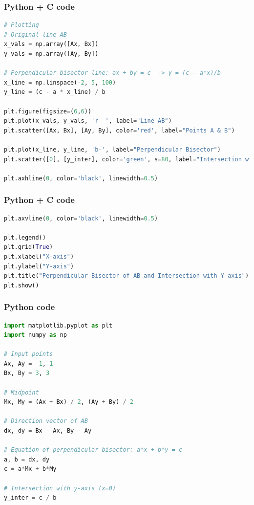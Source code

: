 \documentclass{beamer}
\begin{document}
\begin{frame}[fragile]
    \frametitle{Python + C code}

    \begin{lstlisting}[language=Python]
# Plotting
# Original line AB
x_vals = np.array([Ax, Bx])
y_vals = np.array([Ay, By])

# Perpendicular bisector line: ax + by = c  -> y = (c - a*x)/b
x_line = np.linspace(-2, 5, 100)
y_line = (c - a * x_line) / b

plt.figure(figsize=(6,6))
plt.plot(x_vals, y_vals, 'r--', label="Line AB")
plt.scatter([Ax, Bx], [Ay, By], color='red', label="Points A & B")

plt.plot(x_line, y_line, 'b-', label="Perpendicular Bisector")
plt.scatter([0], [y_inter], color='green', s=80, label="Intersection with y-axis")

plt.axhline(0, color='black', linewidth=0.5)
    \end{lstlisting}
\end{frame}
\begin{frame}[fragile]
    \frametitle{Python + C code}

    \begin{lstlisting}[language=Python]
plt.axvline(0, color='black', linewidth=0.5)

plt.legend()
plt.grid(True)
plt.xlabel("X-axis")
plt.ylabel("Y-axis")
plt.title("Perpendicular Bisector of AB and Intersection with Y-axis")
plt.show()
      \end{lstlisting}
\end{frame}
\begin{frame}[fragile]
    \frametitle{Python code}
    \begin{lstlisting}[language=Python]
import matplotlib.pyplot as plt
import numpy as np

# Input points
Ax, Ay = -1, 1
Bx, By = 3, 3

# Midpoint
Mx, My = (Ax + Bx) / 2, (Ay + By) / 2

# Direction vector of AB
dx, dy = Bx - Ax, By - Ay

# Equation of perpendicular bisector: a*x + b*y = c
a, b = dx, dy
c = a*Mx + b*My

# Intersection with y-axis (x=0)
y_inter = c / b

    \end{lstlisting}
\end{frame}
\end{document}
